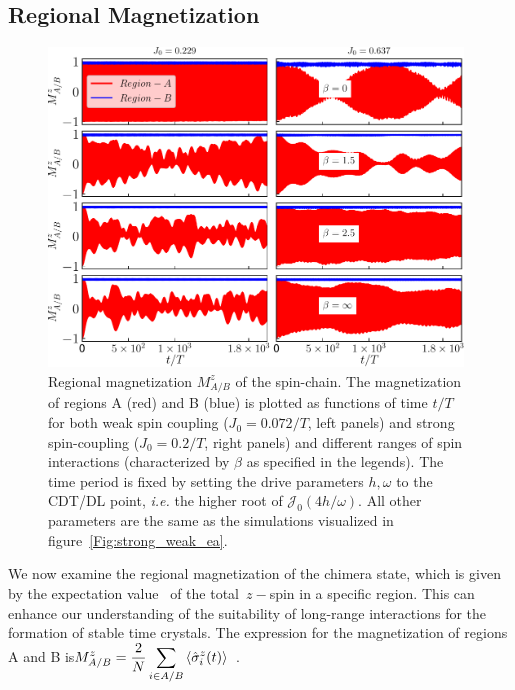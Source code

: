 \documentclass[12pt]{iopart}
\begin{document}
\subsection{\label{sec:level42} Regional Magnetization}
\begin{figure}[h]
	\centering
	\hspace{1.5cm}\includegraphics[width = 11cm]{figure8.pdf}
	\caption{Regional magnetization $M^z_{A/B}$ of the spin-chain. The magnetization of regions A (red) and B (blue) is plotted as functions of time $t/T$ for both weak spin coupling ($J_0=0.072/T$, left panels) and strong spin-coupling ($J_0=0.2/T$, right panels) and different ranges of spin interactions (characterized by $\beta$ as specified in the legends). The time period is fixed by setting the drive parameters $h,\omega$ to the CDT/DL point, \textit{i.e.} the higher root of $\mathcal{J}_0(4h/\omega)$. All other parameters are the same as the simulations visualized in figure~\ref{Fig:strong_weak_ea}.}
	\label{Fig:regiogionalmag}
\end{figure}
We now examine the regional magnetization of the chimera state, which is given by the expectation value  of the total $z-$spin in a specific region. This can enhance our understanding of the suitability of long-range interactions for the formation of stable time crystals. The expression for the magnetization of regions A and B is$\displaystyle M^z_{A/B}=\frac{2}{N}\sum_{i\in{A/B}}\expval{\hat{\sigma}^z_i(t)}$~\cite{sakurai_phys_nodate}.
\end{document}
